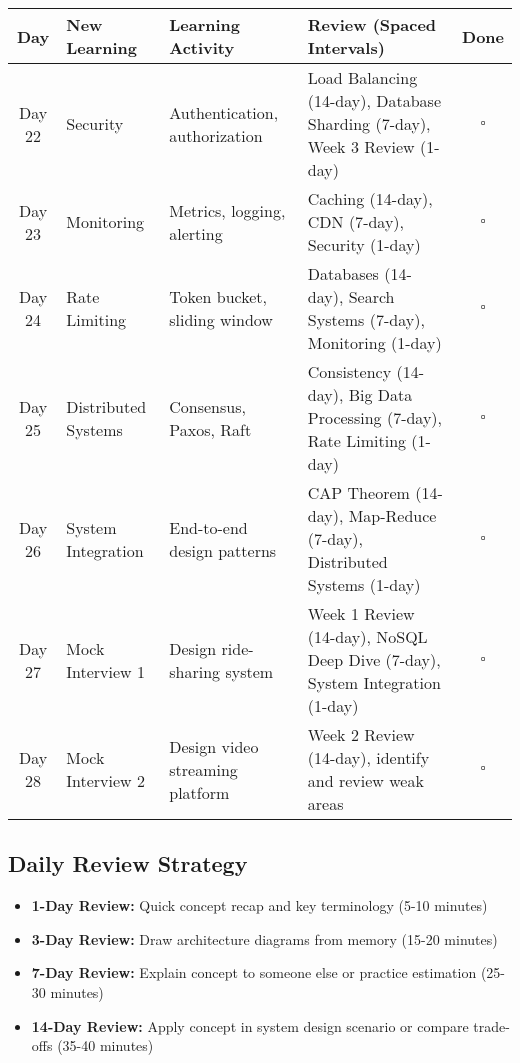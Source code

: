 \documentclass[10pt,a4paper]{article}
\begin{document}
\begin{table}[h]
\centering
\small
\begin{tabular}{|c|p{3cm}|p{4cm}|p{4cm}|c|}
\hline
\textbf{Day} & \textbf{New Learning} & \textbf{Learning Activity} & \textbf{Review (Spaced Intervals)} & \textbf{Done} \\
\hline
Day 22 & Security & Authentication, authorization & Load Balancing (14-day), Database Sharding (7-day), Week 3 Review (1-day) & $\square$ \\
\hline
Day 23 & Monitoring & Metrics, logging, alerting & Caching (14-day), CDN (7-day), Security (1-day) & $\square$ \\
\hline
Day 24 & Rate Limiting & Token bucket, sliding window & Databases (14-day), Search Systems (7-day), Monitoring (1-day) & $\square$ \\
\hline
Day 25 & Distributed Systems & Consensus, Paxos, Raft & Consistency (14-day), Big Data Processing (7-day), Rate Limiting (1-day) & $\square$ \\
\hline
Day 26 & System Integration & End-to-end design patterns & CAP Theorem (14-day), Map-Reduce (7-day), Distributed Systems (1-day) & $\square$ \\
\hline
Day 27 & Mock Interview 1 & Design ride-sharing system & Week 1 Review (14-day), NoSQL Deep Dive (7-day), System Integration (1-day) & $\square$ \\
\hline
Day 28 & Mock Interview 2 & Design video streaming platform & Week 2 Review (14-day), identify and review weak areas & $\square$ \\
\hline
\end{tabular}
\end{table}

\subsection{Daily Review Strategy}

\begin{itemize}
\item \textbf{1-Day Review:} Quick concept recap and key terminology (5-10 minutes)
\item \textbf{3-Day Review:} Draw architecture diagrams from memory (15-20 minutes)
\item \textbf{7-Day Review:} Explain concept to someone else or practice estimation (25-30 minutes)
\item \textbf{14-Day Review:} Apply concept in system design scenario or compare trade-offs (35-40 minutes)
\end{itemize}
\end{document}

